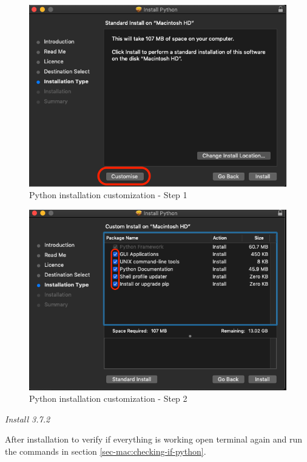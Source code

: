 \documentclass{cmc}
\begin{document}
\begin{figure}[H]
  \centering
  \includegraphics[width=\textwidth]{figures/python_install_4}
  \caption{Python installation customization - Step 1}
  \label{fig:mac-py-step1}
\end{figure}

\begin{figure}[H]
  \centering
  \includegraphics[width=\textwidth]{figures/python_install_5}
  \caption{Python installation customization - Step 2}
  \label{fig:mac-py-step2}
\end{figure}


\textbf{}\textit{Install 3.7.2}

After installation to verify if everything is working open terminal
again and run the commands in section
\ref{sec-mac:checking-if-python}.
\end{document}
